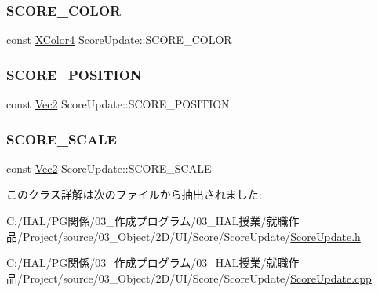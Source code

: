 \subsubsection{\texorpdfstring{S\+C\+O\+R\+E\+\_\+\+C\+O\+L\+OR}{SCORE\_COLOR}}
{\footnotesize\ttfamily const \mbox{\hyperlink{_vector3_d_8h_a680c30c4a07d86fe763c7e01169cd6cc}{X\+Color4}} Score\+Update\+::\+S\+C\+O\+R\+E\+\_\+\+C\+O\+L\+OR\hspace{0.3cm}{\ttfamily [static]}}

\mbox{\label{class_score_update_a88bd91fc66dd629a849ab9f0a178150c}} 
\subsubsection{\texorpdfstring{S\+C\+O\+R\+E\+\_\+\+P\+O\+S\+I\+T\+I\+ON}{SCORE\_POSITION}}
{\footnotesize\ttfamily const \mbox{\hyperlink{_vector3_d_8h_a5ef6e95dfc5f9d3820b71772d99bbc25}{Vec2}} Score\+Update\+::\+S\+C\+O\+R\+E\+\_\+\+P\+O\+S\+I\+T\+I\+ON\hspace{0.3cm}{\ttfamily [static]}}

\mbox{\label{class_score_update_a23e9b8c4c6624cf5f3b66258771b3243}} 
\subsubsection{\texorpdfstring{S\+C\+O\+R\+E\+\_\+\+S\+C\+A\+LE}{SCORE\_SCALE}}
{\footnotesize\ttfamily const \mbox{\hyperlink{_vector3_d_8h_a5ef6e95dfc5f9d3820b71772d99bbc25}{Vec2}} Score\+Update\+::\+S\+C\+O\+R\+E\+\_\+\+S\+C\+A\+LE\hspace{0.3cm}{\ttfamily [static]}}



このクラス詳解は次のファイルから抽出されました\+:\begin{DoxyCompactItemize}
\item 
C\+:/\+H\+A\+L/\+P\+G関係/03\+\_\+作成プログラム/03\+\_\+\+H\+A\+L授業/就職作品/\+Project/source/03\+\_\+\+Object/2\+D/\+U\+I/\+Score/\+Score\+Update/\mbox{\hyperlink{_score_update_8h}{Score\+Update.\+h}}\item 
C\+:/\+H\+A\+L/\+P\+G関係/03\+\_\+作成プログラム/03\+\_\+\+H\+A\+L授業/就職作品/\+Project/source/03\+\_\+\+Object/2\+D/\+U\+I/\+Score/\+Score\+Update/\mbox{\hyperlink{_score_update_8cpp}{Score\+Update.\+cpp}}\end{DoxyCompactItemize}
